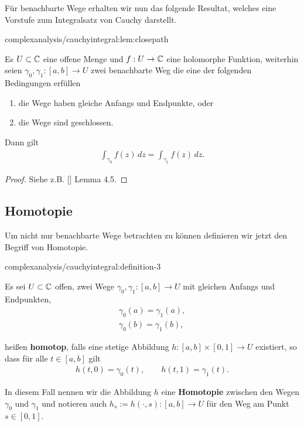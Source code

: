 \par
Für benachbarte Wege erhalten wir nun das folgende Resultat, welches eine Vorstufe zum Integralsatz von Cauchy darstellt.
\begin{lemma}{}{complexanalysis/cauchyintegral:lem:closepath}



\par
Es \(U\subset\mathbb{C}\) eine offene Menge und \(f:U\to\mathbb{C}\) eine holomorphe Funktion, weiterhin seien \(\gamma_0,\gamma_1:[a,b]\to U\) zwei benachbarte Weg die eine der folgenden Bedingungen erfüllen
\begin{enumerate}

\item {} 
\par
die Wege haben gleiche Anfangs  und Endpunkte, oder

\item {} 
\par
die Wege sind geschlossen.

\end{enumerate}

\par
Dann gilt
\begin{align*}
\int_{\gamma_0} f(z)\, dz = \int_{\gamma_1} f(z)\, dz.
\end{align*}\end{lemma}

\begin{proof}
 Siehe z.B. {[}{]} Lemma 4.5.
\end{proof}


\subsection{Homotopie}
\label{\detokenize{complexanalysis/cauchyintegral:homotopie}}
\par
Um nicht nur benachbarte Wege betrachten zu können definieren wir jetzt den Begriff von Homotopie.
\begin{definition}{}{complexanalysis/cauchyintegral:definition-3}



\par
Es sei \(U\subset\mathbb{C}\) offen, zwei Wege \(\gamma_0, \gamma_1:[a,b]\to U\) mit gleichen Anfangs und Endpunkten,
\begin{align*}
\gamma_0(a) = \gamma_1(a),\\
\gamma_0(b) = \gamma_1(b),
\end{align*}
\par
heißen \textbf{homotop}, falls eine stetige Abbildung \(h:[a,b]\times[0,1]\to U\) existiert, so dass für alle \(t\in[a,b]\) gilt
\begin{align*}
h(t,0) = \gamma_0(t), \qquad h(t,1) = \gamma_1(t).
\end{align*}
\par
In diesem Fall nennen wir die Abbildung \(h\) eine \textbf{Homotopie} zwischen den Wegen \(\gamma_0\) und \(\gamma_1\) und notieren auch \(h_s:=h(\cdot,s):[a,b]\to U\) für den Weg am Punkt \(s\in [0,1]\).
\end{definition}

